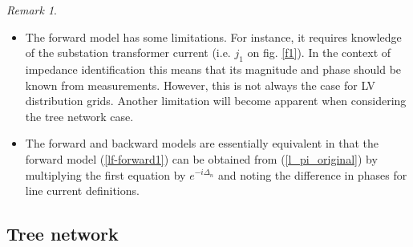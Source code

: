 \documentclass[journal,10pt,onecolumn,draftclsnofoot,]{IEEEtran}
\theoremstyle{plain}
\theoremstyle{definition}
\theoremstyle{remark}
\newtheorem*{remark}{Remark}
\begin{document}
\begin{remark} \hfill
\begin{itemize}
  \begin{comment}
  \item Another useful forward model formulation is obtained after excluding the phase term $e^{i\Delta_{n}}$:
        \begin{equation}
        \begin{split}
        |v_{n-1}| - |v_{n}|e^{-i\Delta_{n}} = j_{n}z_{n} \\
        j_{n+1} = j_{n}\frac{|v_{n-1}|}{|v_{n}|} - z_{n}^*\frac{|j_{n}|^2}{|v_{n}|} - i_{n}
        \end{split}
        \label{lf-forward2}
        \end{equation}
  \end{comment}
  \item The forward model has some limitations. For instance, it requires knowledge of the substation transformer current (i.e. $j_{1}$ on fig. \ref{f1}). In the context of impedance identification this means that its magnitude and phase should be known from measurements. However, this is not always the case for LV distribution grids. Another limitation will become apparent when considering the tree network case. 
  \item The forward and backward models are essentially equivalent in that the forward model (\ref{lf-forward1}) can be obtained from (\ref{l_pi_original}) by multiplying the first equation by $e^{-i\Delta_{n}}$ and noting the difference in phases for line current definitions.  
\end{itemize} 
\end{remark}

\subsection{Tree network}{}
\end{document}
